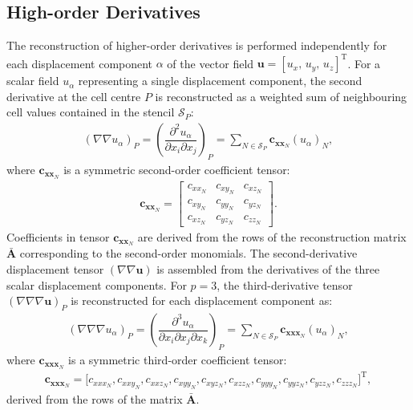 \documentclass[sn-mathphys,Numbered]{sn-jnl}%
\newcommand{\bb}{\boldsymbol}
\begin{document}
\begin{appendices}
\section{High-order Derivatives}
\label{app:derivatives}
%
%
The reconstruction of higher-order derivatives is performed independently for each displacement component $\alpha$ of the vector field
$\bb{u} = [u_x,\,u_y,\,u_z]^{\mathrm{T}}$.
For a scalar field $u_{\alpha}$ representing a single displacement component, the second derivative at the cell centre $P$ is reconstructed as a weighted sum of neighbouring cell values contained in the stencil $\mathcal{S}_P$:
\begin{eqnarray}
(\nabla \nabla {u_{\alpha}})_{P} = \left( \dfrac{\partial^2 u_{\alpha}}{\partial x_i \partial x_j} \right)_P
= \sum_{N \in \mathcal{S}_P} \bb{c}_{{\bb{x}\bb{x}}_N} ({u}_{\alpha})_N,
\label{eq:hessianComponent}
\end{eqnarray}
%
where $\bb{c}_{{\bb{x}\bb{x}}_N}$ is a symmetric second-order coefficient tensor:
%
\begin{eqnarray}
\bb{c}_{{\bb{x}\bb{x}}_N} =
\begin{bmatrix}
c_{xx_N} & c_{xy_N} & c_{xz_N} \\
c_{xy_N} & c_{yy_N} & c_{yz_N} \\
c_{xz_N} & c_{yz_N} & c_{zz_N}
\end{bmatrix}.
\label{eq:secondTensor}
\end{eqnarray}
Coefficients in tensor $\bb{c}_{{\bb{x}\bb{x}}_N}$ are derived from the rows of the reconstruction matrix $\mathbf{\bar{A}}$ corresponding to the second-order monomials.
The second-derivative displacement tensor $(\nabla \nabla \bb{u})$ is assembled from the derivatives of the three scalar displacement components.
%
For $p = 3$, the third-derivative tensor $(\nabla \nabla \nabla \boldsymbol{u})_P$ is reconstructed for each displacement component as:
%
\begin{eqnarray}
(\nabla \nabla \nabla {u}_{\alpha})_P = \left( \dfrac{\partial^3 u_{\alpha}}{\partial x_i \partial x_j \partial x_k} \right)_P
= \sum_{N \in \mathcal{S}_P} \mathbf{c}_{\bb{x}\bb{x}\bb{x}_N}({u}_{\alpha})_N,
\label{eq:thirdTensor}
\end{eqnarray}
where $\mathbf{c}_{\bb{x}\bb{x}\bb{x}_N}$ is a symmetric third-order coefficient tensor:
%
\begin{eqnarray}
\mathbf{c}_{\bb{x}\bb{x}\bb{x}_N} =\big[c_{xxx_N},c_{xxy_N},c_{xxz_N},c_{xyy_N},c_{xyz_N},c_{xzz_N},c_{yyy_N},c_{yyz_N},c_{yzz_N},c_{zzz_N}\big]^{\mathrm{T}},
\end{eqnarray}
%
derived from the rows of the matrix $\mathbf{\bar{A}}$.


\end{appendices}
\end{document}

